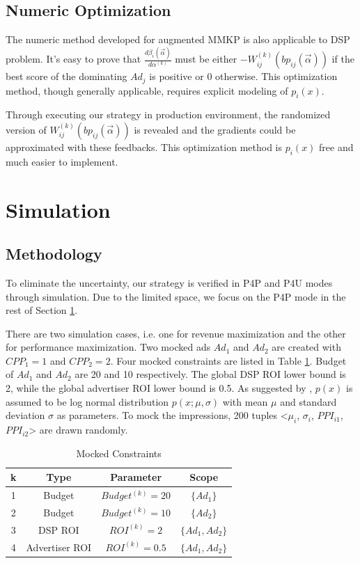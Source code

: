\documentclass[sigconf]{acmart}
\newcommand{\sbp}{bp_{ij}}
\newcommand{\sW}{W_{ij}^{(k)}}
\newcommand{\salpha}{\alpha^{(k)}}
\newcommand{\sbeta}{\beta_i}
\newcommand{\valpha}{\vec{\alpha}}
\begin{document}
\subsection{Numeric Optimization} \label{DSPNumericOptimization}

The numeric method developed for augmented MMKP is also applicable to DSP problem.
It's easy to prove that $\frac{d\sbeta(\valpha)}{d\salpha}$ must be
    either $-\sW(\sbp(\valpha))$ if the best score of the dominating $Ad_j$ is positive or $0$ otherwise.
This optimization method, though generally applicable, requires explicit modeling of $p_i(x)$.

Through executing our strategy in production environment, the randomized version of $\sW(\sbp(\valpha))$ is revealed
    and the gradients could be approximated with these feedbacks.
This optimization method is $p_i(x)$ free and much easier to implement.

\section{Simulation} \label{Simulation}

\subsection{Methodology}

To eliminate the uncertainty, our strategy is verified in P4P and P4U modes through simulation.
Due to the limited space, we focus on the P4P mode in the rest of Section \ref{Simulation}.

There are two simulation cases, i.e. one for revenue maximization and the other for performance maximization.
Two mocked ads $Ad_1$ and $Ad_2$ are created with $CPP_1=1$ and $CPP_2=2$.
Four mocked constraints are listed in Table \ref{TableConstraints}.
Budget of $Ad_1$ and $Ad_2$ are 20 and 10 respectively.
The global DSP ROI lower bound is 2, while the global advertiser ROI lower bound is 0.5.
As suggested by \cite{YingCui2011}, $p(x)$ is assumed to be log normal distribution $p(x;\mu,\sigma)$
    with mean $\mu$ and standard deviation $\sigma$ as parameters.
To mock the impressions, 200 tuples <$\mu_i$, $\sigma_i$, $PPI_{i1}$, $PPI_{i2}$> are drawn randomly.

\begin{table}
\caption{Mocked Constraints\label{TableConstraints}}
\begin{center}
\begin{tabular}{|c|c|c|c|}
\hline
k   & Type            & Parameter           & Scope   \\
\hline
1   & Budget          & $Budget^{(k)} = 20$ & $\{Ad_1\}$        \\
\hline
2   & Budget          & $Budget^{(k)} = 10$ & $\{Ad_2\}$        \\
\hline
3   & DSP ROI         & $ROI^{(k)} = 2$     & $\{Ad_1, Ad_2\}$  \\
\hline
4   & Advertiser ROI  & $ROI^{(k)} = 0.5$   & $\{Ad_1, Ad_2\}$  \\
\hline
\end{tabular}
\end{center}
\end{table}
\end{document}
